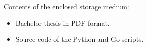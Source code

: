 \documentclass[12pt,a4paper,bibliography=totocnumbered,listof=totocnumbered]{article}
\begin{document}
\appendix


\label{app:perf_script}




% 
% 

{}

Contents of the enclosed storage medium:
\begin{itemize}
  \item Bachelor thesis in PDF format.
  \item Source code of the Python and Go scripts.
\end{itemize}

\appendix


\pagebreak
\end{document}
